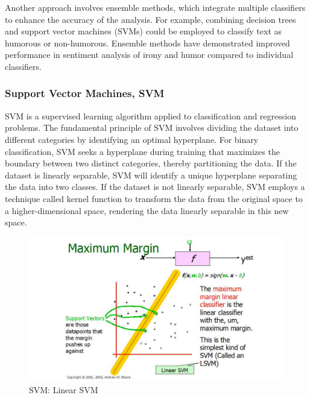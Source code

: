 \documentclass[a4paper]{article}
\begin{document}
Another approach involves ensemble methods, which integrate multiple classifiers to enhance the accuracy of the analysis. For example, combining decision trees and support vector machines (SVMs) could be employed to classify text as humorous or non-humorous. Ensemble methods have demonstrated improved performance in sentiment analysis of irony and humor compared to individual classifiers.

\subsubsection{Support Vector Machines, SVM}

SVM is a supervised learning algorithm applied to classification and regression problems. The fundamental principle of SVM involves dividing the dataset into different categories by identifying an optimal hyperplane. For binary classification, SVM seeks a hyperplane during training that maximizes the boundary between two distinct categories, thereby partitioning the data. If the dataset is linearly separable, SVM will identify a unique hyperplane separating the data into two classes. If the dataset is not linearly separable, SVM employs a technique called kernel function to transform the data from the original space to a higher-dimensional space, rendering the data linearly separable in this new space.

\begin{figure}[H]
	\centering
	\includegraphics[width=1\textwidth]{./images/SVM_Linear SVM.png}
	\caption{SVM: Linear SVM}
	\label{fig.SVM_Linear SVM[Illustration of Linear SVM. ( Taken from Andrew W. Moore slides 2003)]}
\end{figure}
\end{document}
